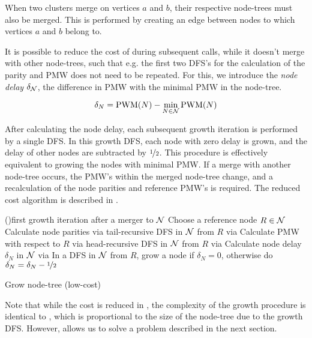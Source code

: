 When two clusters merge on vertices $a$ and $b$, their respective node-trees must also be merged. This is performed by creating an edge between nodes to which vertices $a$ and $b$ belong to. 

It is possible to reduce the cost of  during subsequent calls, while it doesn't merge with other node-trees, such that e.g. the first two DFS's for the calculation of the parity and PMW does not need to be repeated. For this, we introduce the \emph{node delay} $\delta_{\mathcal{N}}$, the difference in PMW with the minimal PMW in the node-tree. 

\begin{equation}\label{eq:nodedelay}
  \delta_N = \text{PWM}(N) - \min_{N\in\mathcal{N}}{\text{PWM}(N) }
\end{equation}

After calculating the node delay, each subsequent growth iteration is performed by a single DFS. In this growth DFS, each node with zero delay is grown, and the delay of other nodes are subtracted by $\nicefrac{1}{2}$. This procedure is effectively equivalent to growing the nodes with minimal PMW. If a merge with another node-tree occurs, the PMW's within the merged node-tree change, and a recalculation of the node parities and reference PMW's is required. The reduced cost algorithm is described in . 

\begin{algorithm}[h]
  \BlankLine
  \KwResult{$\nset$}
  \BlankLine

  \If(){first growth iteration after a merger to $\nset$}{
    Choose a reference node $R \in \mathcal{N}$\;
    Calculate node parities via tail-recursive DFS in $\nset$ from $R$ via \;
    Calculate PMW with respect to $R$ via head-recursive DFS in $\nset$ from $R$ via \; 
    Calculate node delay $\delta_N$ in $\nset$ via \;
  }
  In a DFS in $\nset$ from $R$, grow a node if $\delta_N = 0$, otherwise do $\delta_N = \delta_N-\nicefrac{1}{2}$\;
  
  \caption{Grow node-tree (low-cost)}\label{algo:growdelay}
\end{algorithm}

Note that while the cost is reduced in , the complexity of the growth procedure is identical to , which is proportional to the size of the node-tree due to the growth DFS. However,  allows us to solve a problem described in the next section. 


